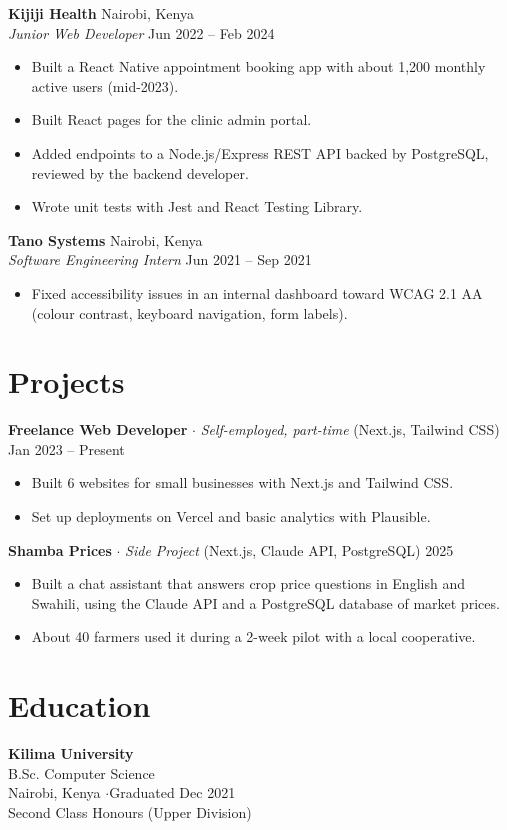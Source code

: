 \documentclass[10pt, letterpaper]{article}
\begin{document}
\vspace{6pt}
\textbf{Kijiji Health} \hfill Nairobi, Kenya \\
\textit{Junior Web Developer} \hfill Jun 2022 -- Feb 2024
\begin{itemize}
    \item Built a React Native appointment booking app with about 1,200 monthly active users (mid-2023).
    \item Built React pages for the clinic admin portal.
    \item Added endpoints to a Node.js/Express REST API backed by PostgreSQL, reviewed by the backend developer.
    \item Wrote unit tests with Jest and React Testing Library.
\end{itemize}

\vspace{6pt}
\textbf{Tano Systems} \hfill Nairobi, Kenya \\
\textit{Software Engineering Intern} \hfill Jun 2021 -- Sep 2021
\begin{itemize}
    \item Fixed accessibility issues in an internal dashboard toward WCAG 2.1 AA (colour contrast, keyboard navigation, form labels).
\end{itemize}

\section*{Projects}

\textbf{Freelance Web Developer} $\cdot$ \textit{Self-employed, part-time} (Next.js, Tailwind CSS) \hfill Jan 2023 -- Present
\begin{itemize}
    \item Built 6 websites for small businesses with Next.js and Tailwind CSS.
    \item Set up deployments on Vercel and basic analytics with Plausible.
\end{itemize}

\vspace{6pt}
\textbf{Shamba Prices} $\cdot$ \textit{Side Project} (Next.js, Claude API, PostgreSQL) \hfill 2025
\begin{itemize}
    \item Built a chat assistant that answers crop price questions in English and Swahili, using the Claude API and a PostgreSQL database of market prices.
    \item About 40 farmers used it during a 2-week pilot with a local cooperative.
\end{itemize}

\section*{Education}
\textbf{Kilima University} \\
B.Sc. Computer Science \\
Nairobi, Kenya \quad$\cdot$\quad Graduated Dec 2021 \\
Second Class Honours (Upper Division)
\end{document}
